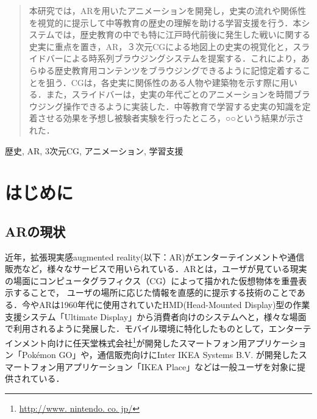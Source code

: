 \documentclass[a4paper,dvipdfmx]{hisken}
\begin{document}

\begin{abstract}
本研究では，ARを用いたアニメーションを開発し，史実の流れや関係性を視覚的に提示して中等教育の歴史の理解を助ける学習支援を行う．本システムでは，歴史教育の中でも特に江戸時代前後に発生した戦いに関する史実に重点を置き，AR，３次元CGによる地図上の史実の視覚化と，スライドバーによる時系列ブラウジングシステムを提案する．これにより，あらゆる歴史教育用コンテンツをブラウジングできるように記憶定着することを狙う．CGは，各史実に関係性のある人物や建築物を示す際に用いる．また，スライドバーは，史実の年代ごとのアニメーションを時間ブラウジング操作できるように実装した．中等教育で学習する史実の知識を定着させる効果を予想し被験者実験を行ったところ，○○という結果が示された．
\end{abstract}

\begin{keyword}	
歴史, AR, 3次元CG, アニメーション, 学習支援
\end{keyword}

\maketitle
	
\section{はじめに}
\subsection{ARの現状}

近年，拡張現実感augmented reality(以下：AR)がエンターテインメントや通信販売など，様々なサービスで用いられている\cite{manabe}．ARとは，ユーザが見ている現実の場面にコンピュータグラフィクス（CG）によって描かれた仮想物体を重畳表示することで， ユーザの場所に応じた情報を直感的に提示する技術のことである\cite{kanbara}．今やARは1960年代に使用されていたHMD(Head-Mounted Display)型の作業支援システム「Ultimate Display」\cite{display}から消費者向けのシステムへと，様々な場面で利用されるように発展した\cite{rekimoto}．モバイル環境に特化したものとして，エンターテインメント向けに任天堂株式会社\footnote{\url{http://www. nintendo. co. jp/}}が開発したスマートフォン用アプリケーション「Pok\'{e}mon GO」\cite{hoshi}や，通信販売向けにInter IKEA Systems B.V.\cite{fran} が開発したスマートフォン用アプリケーション「IKEA Place」\cite{ikea}などは一般ユーザを対象に提供されている．
\end{document}
